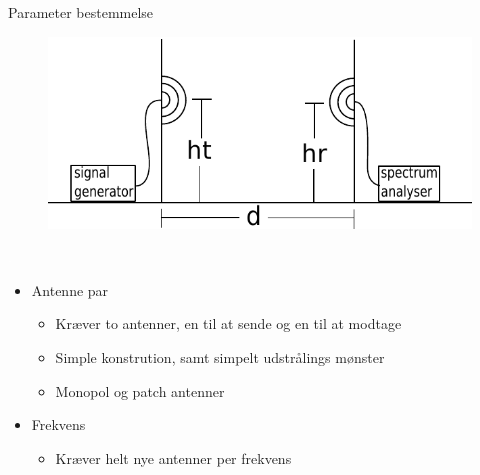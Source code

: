 \begin{frame}{Parameter bestemmelse}
\begin{figure}[!htbp]
	\centering
	\includegraphics[width = 0.8\columnwidth]{figures/setup.pdf}
\end{figure}
\begin{minipage}{0.15\textwidth}
 \textcolor{white}{.}  
\end{minipage}%
\begin{minipage}{0.8\textwidth}
\begin{itemize}
	\item Antenne par
	\begin{itemize}
		\item Kræver to antenner, en til at sende og en til at modtage
		\item Simple konstrution, samt simpelt udstrålings mønster
		\item Monopol og patch antenner
	\end{itemize}
	\item Frekvens
	\begin{itemize}
		\item Kræver helt nye antenner per frekvens
	\end{itemize}
\end{itemize}
\end{minipage}
\end{frame}

